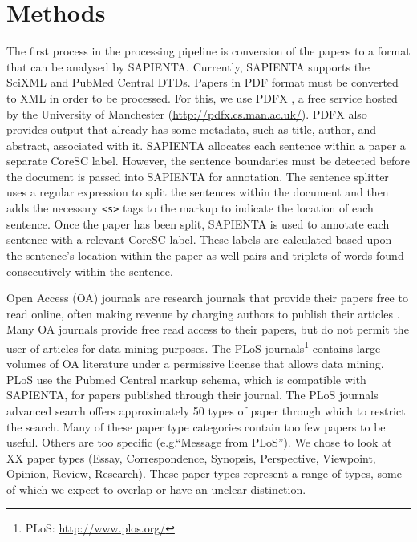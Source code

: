\documentclass{svmult}
\begin{document}


\section{Methods}
\label{sec:2}


The first process in the processing pipeline is conversion of the papers to a
format that can be analysed by SAPIENTA.  Currently, SAPIENTA supports the
SciXML and PubMed Central DTDs.  Papers in PDF format must be converted to XML
in order to be processed.  For this, we use PDFX \cite{PDFX}, a free service
hosted by the University of Manchester (\url{http://pdfx.cs.man.ac.uk/}).  PDFX
also provides output that already has some metadata, such as title, author, and
abstract, associated with it.  SAPIENTA allocates each sentence within a paper
a separate CoreSC label.  However, the sentence boundaries must be detected
before the document is passed into SAPIENTA for annotation.  The sentence
splitter uses a regular expression to split the sentences within the document
and then adds the necessary \verb|<s>| tags to the markup to indicate the
location of each sentence.  Once the paper has been split, SAPIENTA is used to
annotate each sentence with a relevant CoreSC label.  These labels are
calculated based upon the sentence's location within the paper as well pairs
and triplets of words found consecutively within the sentence. 


Open Access (OA) journals are research journals that provide their papers free
to read online, often making revenue by charging authors to publish their
articles \cite{solomon2012study}.  Many OA journals provide free read access to
their papers, but do not permit the user of articles for data mining purposes.
The PLoS journals\footnote{PLoS: \url{http://www.plos.org/}} contains large
volumes of OA literature under a permissive license that allows data mining.
PLoS use the Pubmed Central markup schema, which is compatible with SAPIENTA,
for papers published through their journal.  The PLoS journals advanced search
offers approximately 50 types of paper through which to restrict the search.
Many of these paper type categories contain too few papers to be useful. Others
are too specific (e.g.``Message from PLoS''). We chose to look at XX paper
types (Essay, Correspondence, Synopsis, Perspective, Viewpoint, Opinion,
Review, Research). These paper types represent a range of types, some of which
we expect to overlap or have an unclear distinction. 
\end{document}

